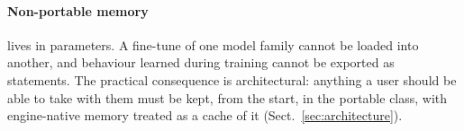 \paragraph{Non-portable memory} lives in parameters. A fine-tune of one model family cannot be
loaded into another, and behaviour learned during training cannot be exported as statements. The
practical consequence is architectural: anything a user should be able to take with them must be
kept, from the start, in the portable class, with engine-native memory treated as a cache of it
(Sect.~\ref{sec:architecture}).
